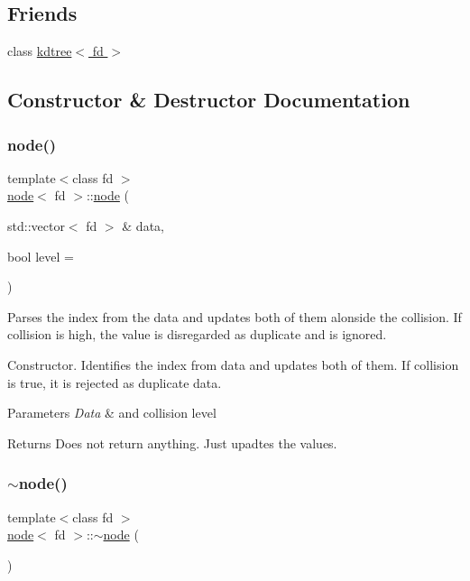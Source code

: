 \subsection*{Friends}
\begin{DoxyCompactItemize}
\item 
class \hyperlink{classnode_a01262b43303642d58dcf997f191757c8}{kdtree$<$ fd $>$}
\end{DoxyCompactItemize}


\subsection{Constructor \& Destructor Documentation}
\mbox{\label{classnode_abb2d5a39b7fcff742324019acaf42d2c}} 
\subsubsection{\texorpdfstring{node()}{node()}}
{\footnotesize\ttfamily template$<$class fd $>$ \\
\hyperlink{classnode}{node}$<$ fd $>$\+::\hyperlink{classnode}{node} (\begin{DoxyParamCaption}\item[{std\+::vector$<$ fd $>$ \&}]{data,  }\item[{bool}]{level = {} }\end{DoxyParamCaption})}



Parses the index from the data and updates both of them alonside the collision. If collision is high, the value is disregarded as duplicate and is ignored. 

Constructor. Identifies the index from data and updates both of them. If collision is true, it is rejected as duplicate data.


\begin{DoxyParams}{Parameters}
{\em Data} & and collision level \\
\hline
\end{DoxyParams}
\begin{DoxyReturn}{Returns}
Does not return anything. Just upadtes the values. 
\end{DoxyReturn}
\mbox{\label{classnode_a55699ad13ccb948e07d3f1e9a1e084e4}} 
\subsubsection{\texorpdfstring{$\sim$node()}{~node()}}
{\footnotesize\ttfamily template$<$class fd $>$ \\
\hyperlink{classnode}{node}$<$ fd $>$\+::$\sim$\hyperlink{classnode}{node} (\begin{DoxyParamCaption}{ }\end{DoxyParamCaption})}




